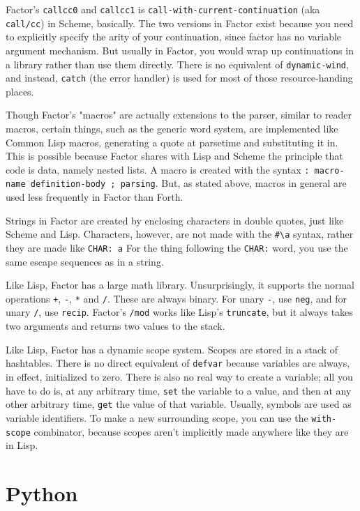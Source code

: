 \documentclass{article}
\begin{document}
Factor's \texttt{callcc0} and \texttt{callcc1} is \texttt{call-with-current-continuation} (aka \texttt{call/cc}) in Scheme, basically. The two versions in Factor exist because you need to explicitly specify the arity of your continuation, since factor has no variable argument mechanism. But usually in Factor, you would wrap up continuations in a library rather than use them directly. There is no equivalent of \texttt{dynamic-wind}, and instead, \texttt{catch} (the error handler) is used for most of those resource-handing places.

Though Factor's "macros" are actually extensions to the parser, similar to reader macros, certain things, such as the generic word system, are implemented like Common Lisp macros, generating a quote at parsetime and substituting it in. This is possible because Factor shares with Lisp and Scheme the principle that code is data, namely nested lists. A macro is created with the syntax \verb|: macro-name definition-body ; parsing|. But, as stated above, macros in general are used less frequently in Factor than Forth.

Strings in Factor are created by enclosing characters in double quotes, just like Scheme and Lisp. Characters, however, are not made with the \verb|#\a| syntax, rather they are made like \verb|CHAR: a| For the thing following the \texttt{CHAR:} word, you use the same escape sequences as in a string.

Like Lisp, Factor has a large math library. Unsurprisingly, it supports the normal operations \texttt{+}, \texttt{-}, \texttt{*} and \texttt{/}. These are always binary. For unary \texttt{-}, use \texttt{neg}, and for unary \texttt{/}, use \texttt{recip}. Factor's \texttt{/mod} works like Lisp's \texttt{truncate}, but it always takes two arguments and returns two values to the stack.

Like Lisp, Factor has a dynamic scope system. Scopes are stored in a stack of hashtables. There is no direct equivalent of \texttt{defvar} because variables are always, in effect, initialized to zero. There is also no real way to create a variable; all you have to do is, at any arbitrary time, \texttt{set} the variable to a value, and then at any other arbitrary time, \texttt{get} the value of that variable. Usually, symbols are used as variable identifiers. To make a new surrounding scope, you can use the \texttt{with-scope} combinator, because scopes aren't implicitly made anywhere like they are in Lisp.

\section{Python}
\end{document}
